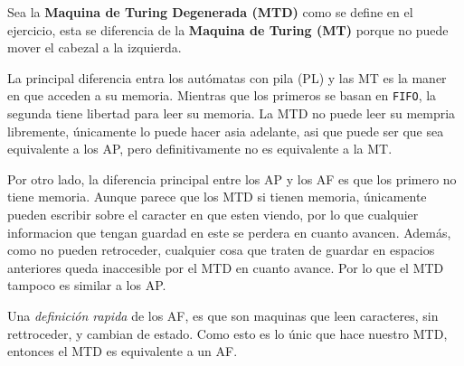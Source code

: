 \documentclass[11pt]{article}
\begin{document}
	\par Sea la \textbf{Maquina de Turing Degenerada (MTD)} como se define en el ejercicio, esta se diferencia de la \textbf{Maquina de Turing (MT)} porque no puede mover el cabezal a la izquierda.
	\par La principal diferencia entra los aut\'omatas con pila (PL) y las MT es la maner en que acceden a su memoria. Mientras que los primeros se basan en \verb|FIFO|, la segunda tiene libertad para leer su memoria. La MTD no puede leer su mempria libremente, \'unicamente lo puede hacer asia adelante, asi que puede ser que sea equivalente a los AP, pero definitivamente no es equivalente a la MT.
	\par Por otro lado, la diferencia principal entre los AP y los AF es que los primero no tiene memoria. Aunque parece que los MTD si tienen memoria, \'unicamente pueden escribir sobre el caracter en que esten viendo, por lo que cualquier informacion que tengan guardad en este se perdera en cuanto avancen. Adem\'as, como no pueden retroceder, cualquier cosa que traten de guardar en espacios anteriores queda inaccesible por el MTD en cuanto avance. Por lo que el MTD tampoco es similar a los AP.
	\par Una \textit{definici\'on rapida} de los AF, es que son maquinas que leen caracteres, sin rettroceder, y cambian de estado. Como esto es lo \'unic que hace nuestro MTD, entonces el MTD es equivalente a un AF.

	
\end{document}
